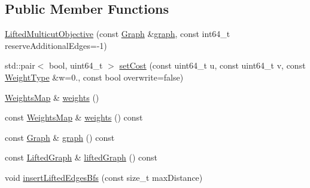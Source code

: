 \subsection*{Public Member Functions}
\begin{DoxyCompactItemize}
\item 
\hyperlink{classnifty_1_1graph_1_1lifted__multicut_1_1LiftedMulticutObjective_ad0e80cc5fd8fd9c7ca036116d5782001}{Lifted\+Multicut\+Objective} (const \hyperlink{classnifty_1_1graph_1_1lifted__multicut_1_1LiftedMulticutObjective_a09c1023d4317152e280bb5e0ede7e4a9}{Graph} \&\hyperlink{classnifty_1_1graph_1_1lifted__multicut_1_1LiftedMulticutObjective_a2a0f7ebd89c68716463eb7c6d2da7b08}{graph}, const int64\+\_\+t reserve\+Additional\+Edges=-\/1)
\item 
std\+::pair$<$ bool, uint64\+\_\+t $>$ \hyperlink{classnifty_1_1graph_1_1lifted__multicut_1_1LiftedMulticutObjective_aa1b83dd5c05bfe68b1040a599555e830}{set\+Cost} (const uint64\+\_\+t u, const uint64\+\_\+t v, const \hyperlink{classnifty_1_1graph_1_1lifted__multicut_1_1LiftedMulticutObjective_abed7e2553691af6e16c0b400dcc05c63}{Weight\+Type} \&w=0., const bool overwrite=false)
\item 
\hyperlink{classnifty_1_1graph_1_1lifted__multicut_1_1LiftedMulticutObjective_a2063225a63332d8a74f82fef80f09d0b}{Weights\+Map} \& \hyperlink{classnifty_1_1graph_1_1lifted__multicut_1_1LiftedMulticutObjective_a186e473c6f3eb39c8d31314fb7d6aef9}{weights} ()
\item 
const \hyperlink{classnifty_1_1graph_1_1lifted__multicut_1_1LiftedMulticutObjective_a2063225a63332d8a74f82fef80f09d0b}{Weights\+Map} \& \hyperlink{classnifty_1_1graph_1_1lifted__multicut_1_1LiftedMulticutObjective_a17bbaac4ac59f2d64a1cdc49efed5d11}{weights} () const 
\item 
const \hyperlink{classnifty_1_1graph_1_1lifted__multicut_1_1LiftedMulticutObjective_a09c1023d4317152e280bb5e0ede7e4a9}{Graph} \& \hyperlink{classnifty_1_1graph_1_1lifted__multicut_1_1LiftedMulticutObjective_a2a0f7ebd89c68716463eb7c6d2da7b08}{graph} () const 
\item 
const \hyperlink{classnifty_1_1graph_1_1lifted__multicut_1_1LiftedMulticutObjective_a3e047dd820c11fb2df428de46d7a5cab}{Lifted\+Graph} \& \hyperlink{classnifty_1_1graph_1_1lifted__multicut_1_1LiftedMulticutObjective_aa47071aaebcfaf876aa44491f02f173c}{lifted\+Graph} () const 
\item 
void \hyperlink{classnifty_1_1graph_1_1lifted__multicut_1_1LiftedMulticutObjective_abce1fc3651d4100d6fbf0ffd40da0c24}{insert\+Lifted\+Edges\+Bfs} (const size\+\_\+t max\+Distance)

\end{DoxyCompactItemize}
